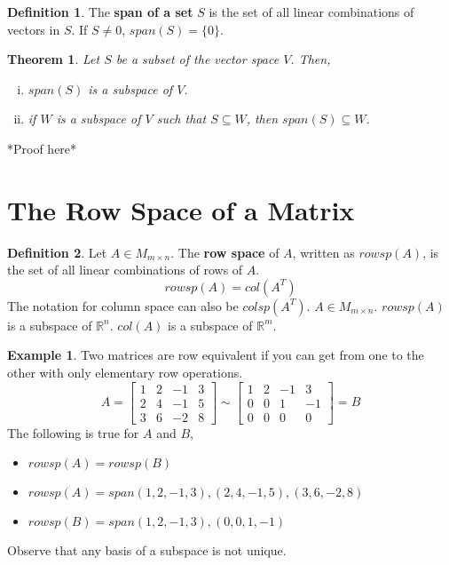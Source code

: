 \documentclass{report}
\newtheorem{_thm}{Theorem}
\theoremstyle{definition}
\newtheorem{_def}{Definition}
\newtheorem{ex}{Example}
\begin{document}
\begin{_def}
The \textbf{span of a set} $S$ is the set of all linear combinations of vectors in $S$.
If $S\neq 0$, $span(S)=\{0\}$.
\end{_def}

\begin{_thm}
Let $S$ be a subset of the vector space $V$.
Then,
\begin{enumerate}[i)]
 \item $span(S)$ is a subspace of $V$.
 \item if $W$ is a subspace of $V$ such that $S\subseteq W$, then $span(S)\subseteq W$.
\end{enumerate}
\end{_thm}

*Proof here*

\section{The Row Space of a Matrix}

\begin{_def}
Let $A\in M_{m\times n}$.
The \textbf{row space} of $A$, written as $rowsp(A)$, is the set of all linear combinations of rows of $A$.
\[rowsp(A)=col(A^T)\]
The notation for column space can also be $colsp(A^T)$.
$A\in M_{m\times n}$.
$rowsp(A)$ is a subspace of $\mathbb{R}^n$.
$col(A)$ is a subspace of $\mathbb{R}^m$.
\end{_def}

\begin{ex}
Two matrices are row equivalent if you can get from one to the other with only elementary row operations.
\[A=
\begin{bmatrix}
1 & 2 & -1 & 3 \\
2 & 4 & -1 & 5 \\
3 & 6 & -2 & 8
\end{bmatrix}\sim
\begin{bmatrix}
1 & 2 & -1 & 3 \\
0 & 0 & 1 & -1 \\
0 & 0 & 0 & 0
\end{bmatrix}=B
\]
The following is true for $A$ and $B$,
\begin{itemize}
 \item $rowsp(A)=rowsp(B)$
 \item $rowsp(A)=span{(1,2,-1,3),(2,4,-1,5),(3,6,-2,8)}$
 \item $rowsp(B)=span{(1,2,-1,3),(0,0,1,-1)}$
\end{itemize}
Observe that any basis of a subspace is not unique.
\end{ex}
\end{document}

